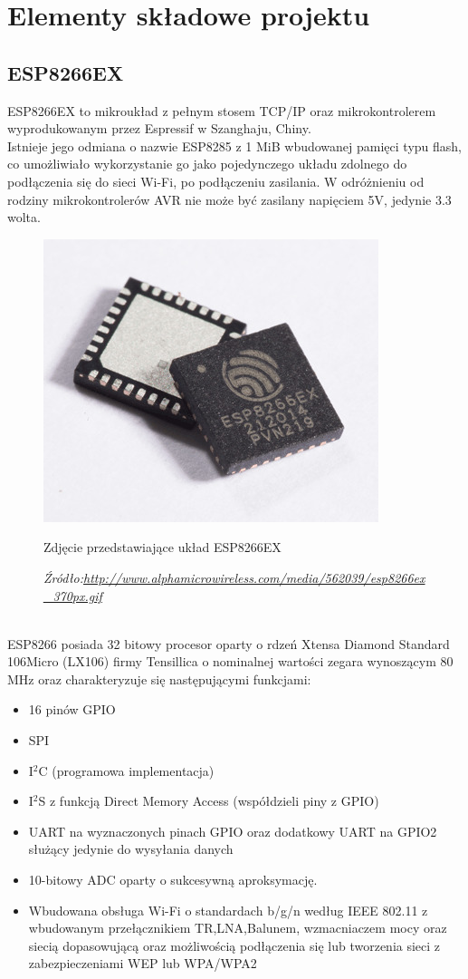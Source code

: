 \documentclass[12pt,a4paper,oneside]{memoir}
\begin{document}
\chapter{Elementy składowe projektu} 
\section{ESP8266EX}
ESP8266EX to mikroukład z pełnym stosem TCP/IP oraz mikrokontrolerem wyprodukowanym przez Espressif w Szanghaju, Chiny.\\
Istnieje jego odmiana o nazwie ESP8285 z 1 MiB wbudowanej pamięci typu flash, co umożliwiało wykorzystanie go jako pojedynczego układu zdolnego do podłączenia się do sieci Wi-Fi, po podłączeniu zasilania. W odróżnieniu od rodziny mikrokontrolerów AVR nie może być zasilany napięciem 5V, jedynie 3.3 wolta.\\
\begin{figure}[h]
	\includegraphics[scale=0.5]{images/esp8266ex.jpg}
	{\tytulyrozdzialow \footnotesize \caption[ESP8266EX]{Zdjęcie przedstawiające układ ESP8266EX}}
	\caption*{\textit{Źródło:\url{http://www.alphamicrowireless.com/media/562039/esp8266ex_370px.gif}}}
\end{figure}\\
ESP8266 posiada 32 bitowy procesor oparty o rdzeń Xtensa Diamond Standard 106Micro (LX106) firmy Tensillica o nominalnej wartości zegara wynoszącym 80 MHz oraz charakteryzuje się następującymi funkcjami:
\begin{itemize}
	\item 16 pinów GPIO
	\item SPI
	\item I$^2$C (programowa implementacja)
	\item I$^2$S z funkcją Direct Memory Access (współdzieli piny z GPIO)
	\item UART na wyznaczonych pinach GPIO oraz dodatkowy UART na GPIO2 służący jedynie do wysyłania danych
	\item 10-bitowy ADC oparty o sukcesywną aproksymację.
	\item Wbudowana obsługa Wi-Fi o standardach b/g/n według IEEE 802.11 z wbudowanym przełącznikiem TR,LNA,Balunem, wzmacniaczem mocy oraz siecią dopasowującą oraz możliwością podłączenia się lub tworzenia sieci z zabezpieczeniami WEP lub WPA/WPA2
\end{itemize}
\end{document}

